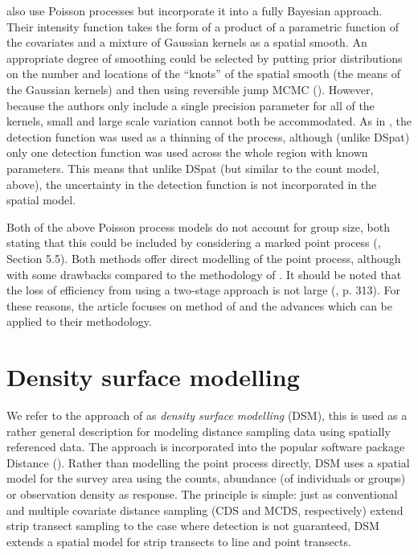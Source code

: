 \documentclass[a4paper,12pt]{article}
\begin{document}
\cite{Niemi:2010kx} also use Poisson processes but incorporate it into a fully Bayesian approach. Their intensity function takes the form of a product of a parametric function of the covariates and a mixture of Gaussian kernels as a spatial smooth. An appropriate degree of smoothing could be selected by putting prior distributions on the number and locations of the ``knots'' of the spatial smooth (the means of the Gaussian kernels) and then using reversible jump MCMC (\cite{GREEN:1995dg}). However, because the authors only include a single precision parameter for all of the kernels, small and large scale variation cannot both be accommodated. As in \cite{Johnson:2010gf}, the detection function was used as a thinning of the process, although (unlike DSpat) only one detection function was used across the whole region with known parameters. This means that unlike DSpat (but similar to the count model, above), the uncertainty in the detection function is not incorporated in the spatial model.

Both of the above Poisson process models do not account for group size, both stating that this could be included by considering a marked point process (\cite{cox1980point}, Section 5.5). Both methods offer direct modelling of the point process, although with some drawbacks compared to the methodology of \cite{Hedley:2004et}. It should be noted that the loss of efficiency from using a two-stage approach is not large (\cite{Buckland:2004ts}, p. 313). For these reasons, the article focuses on method of \cite{Hedley:2004et} and the advances which can be applied to their methodology.

\section*{Density surface modelling}
\label{s:dsm}

We refer to the approach of \cite{Hedley:2004et} as \textit{density surface modelling} (DSM), this is used as a rather general description for modeling distance sampling data using spatially referenced data. The approach is incorporated into the popular software package Distance (\cite{Thomas:2010cf}). Rather than modelling the point process directly, DSM  uses a spatial model for the survey area using the counts, abundance (of individuals or groups) or observation density as response. The principle is simple: just as conventional and multiple covariate distance sampling (CDS and MCDS, respectively) extend strip transect sampling to the case where detection is not guaranteed, DSM extends a spatial model for strip transects to line and point transects.
\end{document}
